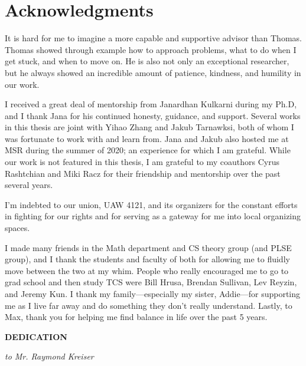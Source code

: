 \documentclass[12pt]{book}
\theoremstyle{theorem}
\theoremstyle{remark}
\theoremstyle{definition}
\theoremstyle{plain}
\theoremstyle{plain}
\theoremstyle{plain}
\theoremstyle{definition}
\theoremstyle{theorem}
\begin{document}
\begin{spacing}{1.5}
  \tableofcontents
\end{spacing}

\chapter*{Acknowledgments}

It is hard for me to imagine a more capable and supportive advisor than Thomas. 
Thomas showed through example how to approach problems, what to do when I get stuck, and when to move on.
He is also not only an exceptional researcher, but he always showed an incredible amount of patience, kindness, and humility in our work. 

I received a great deal of mentorship from Janardhan Kulkarni during my Ph.D, and I thank Jana for his continued 
honesty, guidance, and support.
Several works in this thesis are joint with Yihao Zhang and Jakub Tarnawksi, both of whom I was fortunate to work with and learn from.
Jana and Jakub also hosted me at MSR during the summer of 2020; an experience for which I am grateful.
While our work is not featured in this thesis, I am grateful to my coauthors Cyrus Rashtchian and Miki Racz 
for their friendship and mentorship over the past several years.

I'm indebted to our union, UAW 4121, and its organizers for the constant efforts in fighting for our rights 
and for serving as a gateway for me into local organizing spaces.


I made many friends in the Math department and CS theory group (and PLSE group), and I thank the students and faculty of both 
for allowing me to fluidly move between the two at my whim. 
People who really encouraged me to go to grad school and then study TCS were
Bill Hrusa, Brendan Sullivan, Lev Reyzin, and Jeremy Kun.
I thank my family---especially my sister, Addie---for supporting me as I live far away and do something they don't really understand.
Lastly, to Max, thank you for helping me find balance in life over the past 5 years.


\begin{center}
    \textbf{DEDICATION}


\emph{to Mr. Raymond Kreiser}


\end{center}




\clearpage

\pagestyle{headings}
\setcounter{page}{1}
\renewcommand{\chaptermark}[1]{\markboth{\sc{\chaptername\ \thechapter.\ #1}}{}}
\renewcommand{\sectionmark}[1]{\markright{\sc{\thesection.\ #1}}{}}





\clearpage
{}
\singlespacing


\end{document}

